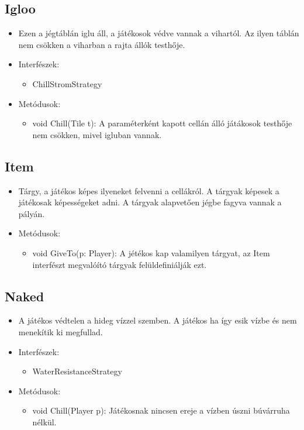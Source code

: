 \subsection{Igloo}
\begin{itemize}
	\item Ezen a jégtáblán iglu áll, a játékosok védve vannak a vihartól. Az ilyen táblán nem csökken a viharban a rajta állók testhője.
	\item Interfészek:
	\begin{itemize} 
		\item ChillStromStrategy
	\end{itemize}
	\item Metódusok:
	\begin{itemize}
		\item void Chill(Tile t): A paraméterként kapott cellán álló játákosok testhője nem csökken, mivel igluban vannak.
	\end{itemize}
\end{itemize}

\subsection{Item}
\begin{itemize}
	\item Tárgy, a játékos képes ilyeneket felvenni a cellákról. A tárgyak képesek a játékosak képességeket adni. A tárgyak alapvetően jégbe fagyva vannak a pályán.
	\item Metódusok:
	\begin{itemize}
		\item void GiveTo(p: Player): A jétékos kap valamilyen tárgyat, az Item interfészt megvalóító tárgyak felüldefiniálják ezt.
	\end{itemize}
\end{itemize}

\subsection{Naked}
\begin{itemize}
	\item A játékos védtelen a hideg vízzel szemben. A játékos ha így esik vízbe és nem menekítik ki megfullad.
	\item Interfészek:
	\begin{itemize}
		\item WaterResistanceStrategy
	\end{itemize}
	\item Metódusok:
	\begin{itemize}
		\item void Chill(Player p): Játékosnak nincsen ereje a vízben úszni búvárruha nélkül.
	\end{itemize}
\end{itemize}

